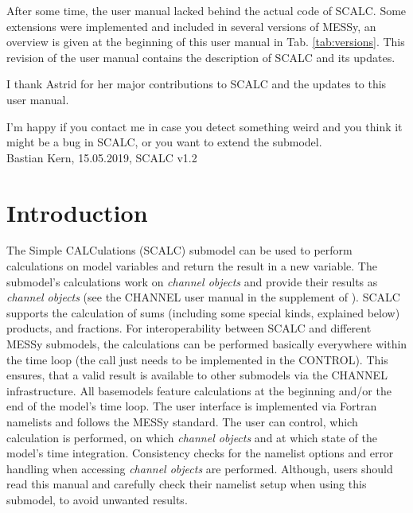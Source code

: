 \documentclass[twoside]{article}
\begin{document}
After some time, the user manual lacked behind the actual code of SCALC.
Some extensions were implemented and included in several versions of MESSy, an overview is given at the beginning of this user manual in Tab. \ref{tab:versions}.
This revision of the user manual contains the description of SCALC and its updates.

I thank Astrid for her major contributions to SCALC and the updates to this user manual.

I'm happy if you contact me in case you detect something weird and you think it might be a bug in SCALC, or you want to extend the submodel.\\

Bastian Kern, 15.05.2019, SCALC v1.2\\

\section{Introduction}
%
The Simple CALCulations (SCALC) submodel can be used to perform calculations on model variables and return the result in a new variable.
The submodel's calculations work on {\it channel objects} and provide their results as {\it channel objects} (see the CHANNEL user manual in the supplement of \citealp{Jockel2010}).
SCALC supports the calculation of sums (including some special kinds, explained below) products, and fractions.
For interoperability between SCALC and different MESSy submodels, the calculations can be performed basically everywhere within the time loop (the call just needs to be implemented in the CONTROL). This ensures, that a valid result is available to other submodels via the CHANNEL infrastructure.
All basemodels feature calculations at the beginning and/or the end of the model's time loop.
The user interface is implemented via Fortran namelists and follows the MESSy standard.
The user can control, which calculation is performed, on which {\it channel objects} and at which state of the model's time integration.
Consistency checks for the namelist options and error handling when accessing {\it channel objects} are performed.
Although, users should read this manual and carefully check their namelist setup when using this submodel, to avoid unwanted results.
\end{document}
